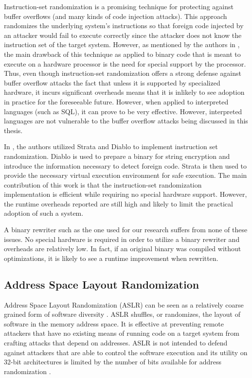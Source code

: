 Instruction-set randomization \cite{isr} is a promising technique for protecting against buffer
overflows (and many kinds of code injection attacks). This approach randomizes the underlying
system's instructions so that foreign code injected by an attacker would fail to execute correctly
since the attacker does not know the instruction set of the target system. However, as mentioned by
the authors in \cite{isr}, the main drawback of this technique as applied to binary code that is meant
to execute on a hardware processor is the need for special support by the processor. Thus, even
though instruction-set randomization offers a strong defense against buffer overflow attacks the
fact that unless it is supported by specialized hardware, it incurs significant overheads means that
it is inlikely to see adoption in practice for the foreseeable future. However, when applied to
interpreted languages (such as SQL), it can prove to be very effective. However, interpreted
languages are not vulnerable to the buffer overflow attacks being discussed in this thesis.

In \cite{strata}, the authors utilized Strata and Diablo to implement instruction set randomization.
Diablo is used to prepare a binary for string encryption and introduce the information necessary to
detect foreign code. Strata is then used to provide the necessary virtual execution environment for
safe execution. The main contribution of this work is that the instruction-set randomization
implementation is efficient while requiring no special hardware support. However, the runtime
overheads reported are still high and likely to limit the practical adoption of such a system.

A binary rewriter such as the one used for our research suffers from none of these issues. No
special hardware is required in order to utilize a binary rewriter and overheads are relatively low.
In fact, if an original binary was compiled without optimizations, it is likely to see a runtime
improvement when rewritten.

\subsection{Address Space Layout Randomization}

Address Space Layout Randomization (ASLR) can be seen as a relatively coarse grained form of
software diversity \cite{aslr}. ASLR shuffles, or randomizes, the layout of software in the memory
address space. It is effective at preventing remote attackers that have no existing means of running
code on a target system from crafting attacks that depend on addresses. ASLR is not intended to
defend against attackers that are able to control the software execution and its utility on 32-bit
architectures is limited by the number of bits available for address randomization \cite{aslr32}.

